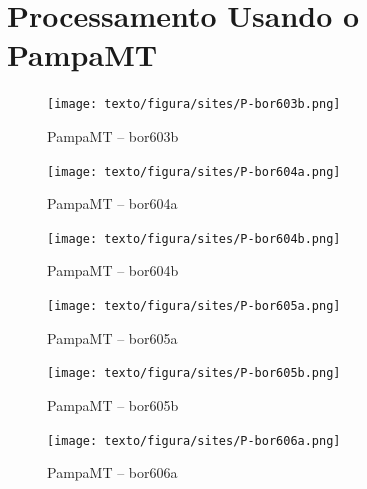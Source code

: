 \chapter{Processamento Usando o {PampaMT}}
\label{ap-pampamt}
\begin{figure}[H]
        \caption{PampaMT -- bor603b}
            \begin{center}
                \texttt{[image: texto/figura/sites/P-bor603b.png]}
            \end{center}
    \end{figure}
    \begin{figure}[H]
        \caption{PampaMT -- bor604a}
            \begin{center}
                \texttt{[image: texto/figura/sites/P-bor604a.png]}
            \end{center}
    \end{figure}
    
    \begin{figure}[H]
        \caption{PampaMT -- bor604b}
            \begin{center}
                \texttt{[image: texto/figura/sites/P-bor604b.png]}
            \end{center}
    \end{figure}
    
    \begin{figure}[H]
        \caption{PampaMT -- bor605a}
            \begin{center}
                \texttt{[image: texto/figura/sites/P-bor605a.png]}
            \end{center}
    \end{figure}
    
    \begin{figure}[H]
        \caption{PampaMT -- bor605b}
            \begin{center}
                \texttt{[image: texto/figura/sites/P-bor605b.png]}
            \end{center}
    \end{figure}
    
    \begin{figure}[H]
        \caption{PampaMT -- bor606a}
            \begin{center}
                \texttt{[image: texto/figura/sites/P-bor606a.png]}
            \end{center}
    \end{figure}
    
